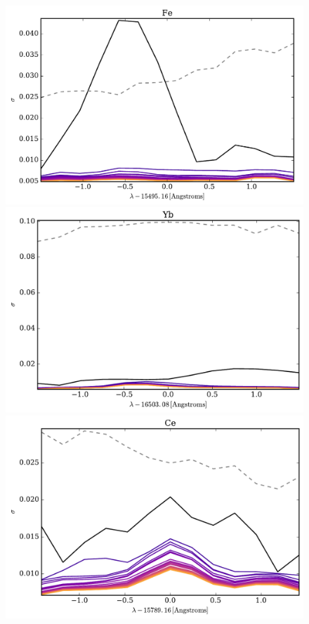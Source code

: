 \documentclass[a4paper,fleqn,usenatbib]{mnras}
\begin{document}
\begin{figure}
	\includegraphics[width=\columnwidth]{apogee_centers_final_29502_spc_iw_prior_win_wid_1p5_fe_conditional_stddevs.pdf}
	\includegraphics[width=\columnwidth]{apogee_centers_final_29502_spc_iw_prior_win_wid_1p5_yb_conditional_stddevs.pdf}
	\includegraphics[width=\columnwidth]{apogee_centers_final_29502_spc_iw_prior_win_wid_1p5_ce_conditional_stddevs.pdf}

\end{figure}
\end{document}
